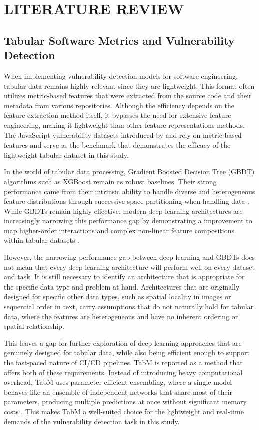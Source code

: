 \chapter{LITERATURE REVIEW}

\section{Tabular Software Metrics and Vulnerability Detection}

When implementing vulnerability detection models for software engineering, tabular data remains highly relevant since they are lightweight. This format often utilizes metric-based features that were extracted from the source code and their metadata from various repositories. Although the efficiency depends on the feature extraction method itself, it bypasses the need for extensive feature engineering, making it lightweight than other feature representations methods. The JavaScript vulnerability datasets introduced by \citet{ferenc_challenging_2019}  and \citet{viszkok_improving_2021} rely on metric-based features and serve as the benchmark that demonstrates the efficacy of the lightweight tabular dataset in this study.

In the world of tabular data processing, Gradient Boosted Decision Tree (GBDT) algorithms such as XGBoost remain as robust baselines. Their strong performance came from their intrinsic ability to handle diverse and heterogeneous feature distributions through successive space partitioning when handling data \citep{ye_closer_2025}. While GBDTs remain highly effective, modern deep learning architectures are increasingly narrowing this performance gap by demonstrating a improvement to map higher-order interactions and complex non-linear feature compositions within tabular datasets \citep{ye_closer_2025}.

However, the narrowing performance gap between deep learning and GBDTs does not mean that every deep learning architecture will perform well on every dataset and task. It is still necessary to identify an architecture that is appropriate for the specific data type and problem at hand. Architectures that are originally designed for specific other data types, such as spatial locality in images or sequential order in text, carry assumptions that do not naturally hold for tabular data, where the features are heterogeneous and have no inherent ordering or spatial relationship.

This leaves a gap for further exploration of deep learning approaches that are genuinely designed for tabular data, while also being efficient enough to support the fast-paced nature of CI/CD pipelines. TabM is reported as a method that offers both of these requirements. Instead of introducing heavy computational overhead, TabM uses parameter-efficient ensembling, where a single model behaves like an ensemble of independent networks that share most of their parameters, producing multiple predictions at once without significant memory costs \citep{gorishniy_tabm_2025}. This makes TabM a well-suited choice for the lightweight and real-time demands of the vulnerability detection task in this study.


